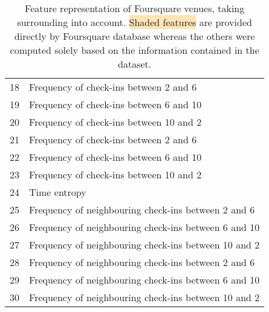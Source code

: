 \begin{table}[hb]
\begin{tabularx}{\textwidth}{lX}
	18 & Frequency of check-ins between 2 \am{} and 6 \am{} \\
	19 & Frequency of check-ins between 6 \am{} and 10 \am{} \\
	20 & Frequency of check-ins between 10 \am{} and 2 \hpm{} \\
	21 & Frequency of check-ins between 2 \hpm{} and 6 \hpm{} \\
	22 & Frequency of check-ins between 6 \hpm{} and 10 \hpm{} \\
	23 & Frequency of check-ins between 10 \hpm{} and 2 \am{} \\
	24 & Time entropy \\
	25 & Frequency of neighbouring check-ins between 2 \am{} and 6 \am{} \\
	26 & Frequency of neighbouring check-ins between 6 \am{} and 10 \am{} \\
	27 & Frequency of neighbouring check-ins between 10 \am{} and 2 \hpm{} \\
	28 & Frequency of neighbouring check-ins between 2 \hpm{} and 6 \hpm{} \\
	29 & Frequency of neighbouring check-ins between 6 \hpm{} and 10 \hpm{} \\
	30 & Frequency of neighbouring check-ins between 10 \hpm{} and 2 \am{} \\
        \bottomrule
    \end{tabularx}
    \caption[Venue features]{Feature representation of Foursquare venues,
	    taking surrounding into account. \colorbox{Moccasin}{Shaded
	    features} are provided directly by Foursquare database whereas the
	    others were computed solely based on the information
	    contained in the dataset.\label{tab:venuefeatures}}
\end{table}

